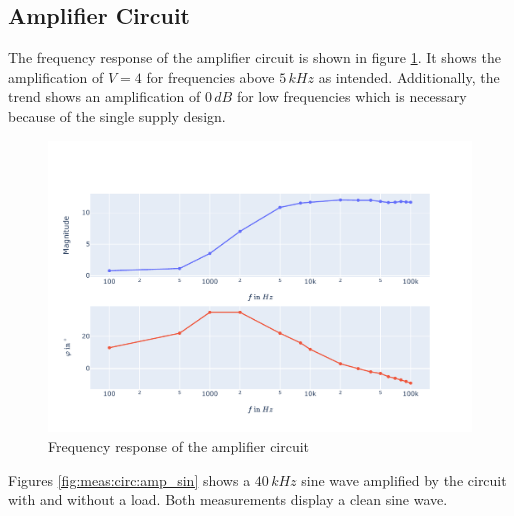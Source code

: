 \subsection{Amplifier Circuit}

The frequency response of the amplifier circuit is shown in figure \ref{fig:meas:circ:amp_bode}. It shows the amplification of $V=4$ for frequencies above $5\,kHz$ as intended. Additionally, the trend shows an amplification of $0\,dB$ for low frequencies which is necessary because of the single supply design.
%
\begin{figure}
  \centering
  \includegraphics[height=\largeheight]{src/assets/pictures/measurements/amp_bode.pdf}
  \caption{Frequency response of the amplifier circuit}\label{fig:meas:circ:amp_bode}
\end{figure}
\p
Figures \ref{fig:meas:circ:amp_sin} shows a $40\,kHz$ sine wave amplified by the circuit with and without a load. Both measurements display a clean sine wave.
%
